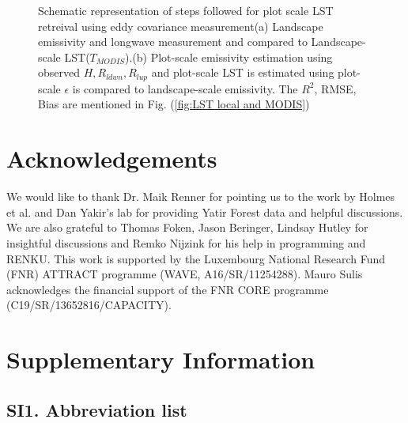 \documentclass[fleqn,10pt]{wlscirep}
\begin{document}
{\begin{figure}[h!]
\begin{subfigure}{.5\textwidth}
{}
\end{subfigure}
\caption{Schematic representation of  steps followed for plot scale LST retreival using eddy covariance measurement(a) Landscape emissivity and longwave measurement and compared to Landscape-scale LST($T_{MODIS}$).(b) Plot-scale emissivity estimation using observed $H, R_{ldwn},R_{lup}$ and plot-scale LST is estimated using plot-scale $\epsilon$ is compared to landscape-scale emissivity. The $R^{2}$, RMSE, Bias are mentioned in Fig. (\ref{fig:LST local and MODIS})}
\label{fig:flow_chart}
\end{figure}





\section{Acknowledgements}
We would like to thank Dr. Maik Renner for pointing us to the work by Holmes et al. and Dan Yakir's lab for providing Yatir Forest data and helpful discussions. We are also grateful to Thomas Foken, Jason Beringer, Lindsay Hutley for insightful discussions and Remko Nijzink for his help in programming and RENKU. This work is supported by the Luxembourg National Research Fund (FNR) ATTRACT programme (WAVE, A16/SR/11254288). Mauro Sulis acknowledges the financial support of the FNR CORE programme (C19/SR/13652816/CAPACITY).


%



%

\section{Supplementary Information}
\subsection*{SI1. Abbreviation list}
\begin{table}[h!]


\end{table}}
\end{document}
